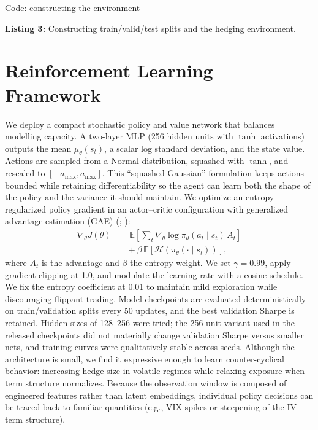 \documentclass[,11pt,letterpaper,twocolumn]{article}
\begin{document}
Code: constructing the environment

\noindent\textbf{Listing 3:} Constructing train/valid/test splits and the hedging environment.


\section{Reinforcement Learning
Framework}\label{reinforcement-learning-framework}

We deploy a compact stochastic policy and value network that balances
modelling capacity. A two-layer MLP (256 hidden units with
$\tanh$ activations) outputs the
mean $\mu_\theta(s_t)$, a scalar log standard deviation, and the state
value. Actions are sampled from a Normal distribution, squashed with
$\tanh$, and rescaled to $[-a_{\max}, a_{\max}]$. This ``squashed
Gaussian'' formulation keeps actions bounded while retaining
differentiability so the agent can learn both the shape of the policy
and the variance it should maintain. We optimize an
entropy-regularized policy gradient in an actor--critic configuration
with generalized advantage estimation (GAE)
(;
):
\begin{align*}
\nabla_{\theta} J(\theta)
&= \mathbb{E}\!\left[ \sum_{t} \nabla_{\theta} \log \pi_{\theta}(a_t \mid s_t)\, A_t \right]\\
&\quad + \beta\, \mathbb{E}\!\left[ \mathcal{H}\!\left(\pi_{\theta}(\cdot \mid s_t)\right) \right],
\end{align*}
where $A_t$ is the advantage and $\beta$ the entropy weight. We set
$\gamma = 0.99$, apply gradient clipping at 1.0, and modulate the
learning rate with a cosine schedule. We fix the entropy coefficient at 0.01 to maintain mild 
exploration while discouraging flippant trading. Model checkpoints are evaluated deterministically on
train/validation splits every 50 updates, and the best validation Sharpe
is retained. Hidden sizes of 128--256 were tried; the 256-unit variant
used in the released checkpoints did not materially change validation
Sharpe versus smaller nets, and training curves were qualitatively
stable across seeds. Although the architecture is small, we find it expressive
enough to learn counter-cyclical behavior: increasing hedge size in
volatile regimes while relaxing exposure when term structure normalizes.
Because the observation window is composed of engineered features rather
than latent embeddings, individual policy decisions can be traced back
to familiar quantities (e.g., VIX spikes or steepening of the IV term
structure).
\end{document}
